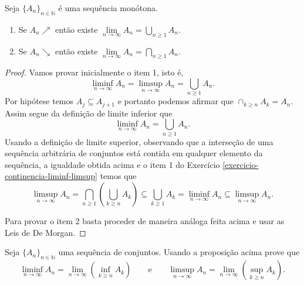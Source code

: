\begin{proposicao}
 Seja $\{A_n\}_{n\in\mathbb{N}}$ é uma sequência monótona.
 \begin{enumerate}
 \item Se $A_n \nearrow$ então existe
 	$ \lim \limits_{n \to \infty} A_n
 	= 
 	\displaystyle\bigcup_{n\geqslant 1} {A_n}$.
 	
 \item Se $A_n \searrow$ então existe 
 	$ \lim \limits_{n \to \infty} A_n
 	= 
 	\displaystyle\bigcap_{n\geqslant 1} {A_n}$.
 \end{enumerate}
\end{proposicao}


\begin{proof}
Vamos provar inicialmente o item 1,
isto é, 
%
\[
	\liminf_{n\to\infty} A_n
	= 
	\limsup_{n\to\infty} A_n
	=
	\displaystyle\bigcup_{n\geqslant 1} {A_n}.
\] 
%
Por hipótese temos $A_j \subseteq A_{j+1}$ e 
portanto podemos afirmar que $\cap_{k\geqslant n} {A_k}=A_n$.
Assim segue da definição de limite inferior que 
\[
\liminf_{n\to\infty} A_n 
= 
\bigcup_{n\geqslant 1} {A_n}.
\]
Usando a definição de limite superior, observando que 
a interseção de uma sequência arbitrária de conjuntos
está contida em qualquer elemento da sequência, 
a igualdade obtida acima e o item 1 do 
Exercício \ref{exercicio-continencia-liminf-limsup} temos que
\[
	\limsup_{n\to\infty} A_n 
	=
	\displaystyle\bigcap_{n\geqslant 1} 
		\left(\displaystyle\bigcup_{k\geqslant n}{A_k} \right)
	\subseteq 
	\displaystyle\bigcup_{k\geqslant 1} {A_k} 
	=
	\liminf_{n\to\infty} A_n 
	\subseteq 
	\limsup_{n\to\infty} A_n.
\]

Para provar o item 2 basta proceder de maneira análoga feita acima 
e usar as Leis de De Morgan.
\end{proof}







\begin{exercicio}
Seja $\{A_n\}_{n\in\mathbb{N}}$ uma sequência de conjuntos. 
Usando a proposição acima prove que
		 \[
		 	\liminf \limits_{n\to \infty}A_n 
			=
			\lim \limits_{n\to \infty}
			\left(\inf \limits_{k\geqslant n}A_k \right)
%
			\qquad\text{e}\qquad
%
		 	\limsup \limits_{n\to \infty}A_n 			
			=
			\lim_{n\to\infty}
			\left( \sup \limits_{k\geqslant n} A_k \right).
		 \]
\end{exercicio}






